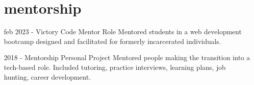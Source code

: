 \documentclass[]{friggeri-cv}
\begin{document}
\section{mentorship}

\begin{entrylist}

  \entry
    {feb 2023 - }
    {Victory Code}
    {Mentor Role}
    {Mentored students in a web development bootcamp designed and facilitated for formerly incarcerated individuals.}

  \entry
    {2018 - }
    {Mentorship}
    {Personal Project}
    {Mentored people making the transition into a tech-based role. Included tutoring, practice interviews, learning plans, job hunting, career development.}

\end{entrylist}
\end{document}
